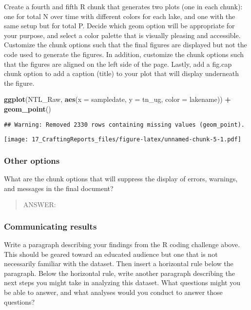 \documentclass[]{article}
\newenvironment{Shaded}{\begin{snugshade}}{\end{snugshade}}
\newcommand{\KeywordTok}[1]{\textcolor[rgb]{0.13,0.29,0.53}{\textbf{#1}}}
\newcommand{\DataTypeTok}[1]{\textcolor[rgb]{0.13,0.29,0.53}{#1}}
\newcommand{\StringTok}[1]{\textcolor[rgb]{0.31,0.60,0.02}{#1}}
\newcommand{\OperatorTok}[1]{\textcolor[rgb]{0.81,0.36,0.00}{\textbf{#1}}}
\newcommand{\NormalTok}[1]{#1}
\begin{document}
Create a fourth and fifth R chunk that generates two plots (one in each
chunk): one for total N over time with different colors for each lake,
and one with the same setup but for total P. Decide which geom option
will be appropriate for your purpose, and select a color palette that is
visually pleasing and accessible. Customize the chunk options such that
the final figures are displayed but not the code used to generate the
figures. In addition, customize the chunk options such that the figures
are aligned on the left side of the page. Lastly, add a fig.cap chunk
option to add a caption (title) to your plot that will display
underneath the figure.

\begin{Shaded}
\begin{Highlighting}[]
\KeywordTok{ggplot}\NormalTok{(NTL_Raw, }\KeywordTok{aes}\NormalTok{(}\DataTypeTok{x =}\NormalTok{ sampledate, }\DataTypeTok{y =}\NormalTok{ tn_ug, }\DataTypeTok{color =}\NormalTok{ lakename)) }\OperatorTok{+}
\StringTok{  }\KeywordTok{geom_point}\NormalTok{()}
\end{Highlighting}
\end{Shaded}

\begin{verbatim}
## Warning: Removed 2330 rows containing missing values (geom_point).
\end{verbatim}

\texttt{[image: 17\_CraftingReports\_files/figure-latex/unnamed-chunk-5-1.pdf]}

\subsubsection{Other options}\label{other-options}

What are the chunk options that will suppress the display of errors,
warnings, and messages in the final document?

\begin{quote}
ANSWER:
\end{quote}

\subsubsection{Communicating results}\label{communicating-results}

Write a paragraph describing your findings from the R coding challenge
above. This should be geared toward an educated audience but one that is
not necessarily familiar with the dataset. Then insert a horizontal rule
below the paragraph. Below the horizontal rule, write another paragraph
describing the next steps you might take in analyzing this dataset. What
questions might you be able to answer, and what analyses would you
conduct to answer those questions?
\end{document}
